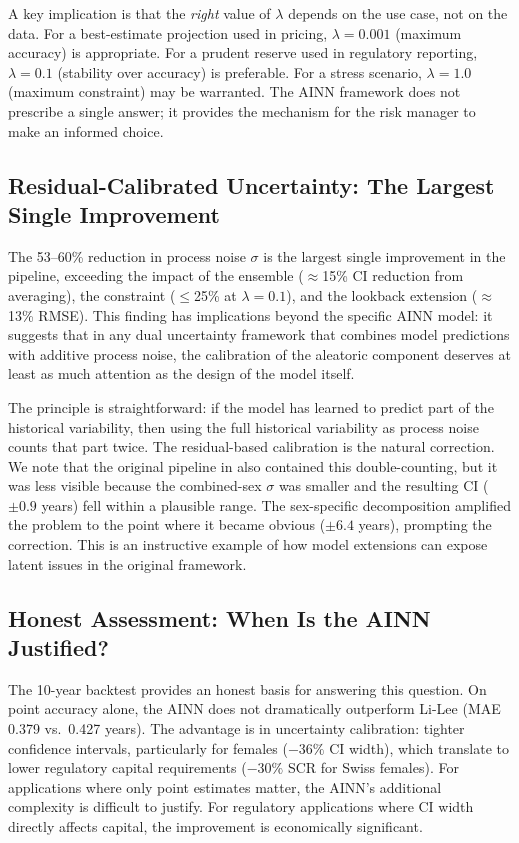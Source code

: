 \documentclass[11pt,a4paper]{article}
\begin{document}
A key implication is that the \textit{right} value of $\lambda$ depends on the use case, not on the data. For a best-estimate projection used in pricing, $\lambda = 0.001$ (maximum accuracy) is appropriate. For a prudent reserve used in regulatory reporting, $\lambda = 0.1$ (stability over accuracy) is preferable. For a stress scenario, $\lambda = 1.0$ (maximum constraint) may be warranted. The AINN framework does not prescribe a single answer; it provides the mechanism for the risk manager to make an informed choice.

\subsection{Residual-Calibrated Uncertainty: The Largest Single Improvement}

The 53--60\% reduction in process noise $\sigma$ is the largest single improvement in the pipeline, exceeding the impact of the ensemble ($\approx$15\% CI reduction from averaging), the constraint ($\leq$25\% at $\lambda = 0.1$), and the lookback extension ($\approx$13\% RMSE). This finding has implications beyond the specific AINN model: it suggests that in any dual uncertainty framework that combines model predictions with additive process noise, the calibration of the aleatoric component deserves at least as much attention as the design of the model itself.

The principle is straightforward: if the model has learned to predict part of the historical variability, then using the full historical variability as process noise counts that part twice. The residual-based calibration is the natural correction. We note that the original pipeline in \cite{rindori2026p04} also contained this double-counting, but it was less visible because the combined-sex $\sigma$ was smaller and the resulting CI ($\pm 0.9$ years) fell within a plausible range. The sex-specific decomposition amplified the problem to the point where it became obvious ($\pm 6.4$ years), prompting the correction. This is an instructive example of how model extensions can expose latent issues in the original framework.

\subsection{Honest Assessment: When Is the AINN Justified?}

The 10-year backtest provides an honest basis for answering this question. On point accuracy alone, the AINN does not dramatically outperform Li-Lee (MAE 0.379 vs.\ 0.427 years). The advantage is in uncertainty calibration: tighter confidence intervals, particularly for females ($-36\%$ CI width), which translate to lower regulatory capital requirements ($-30\%$ SCR for Swiss females). For applications where only point estimates matter, the AINN's additional complexity is difficult to justify. For regulatory applications where CI width directly affects capital, the improvement is economically significant.
\end{document}
